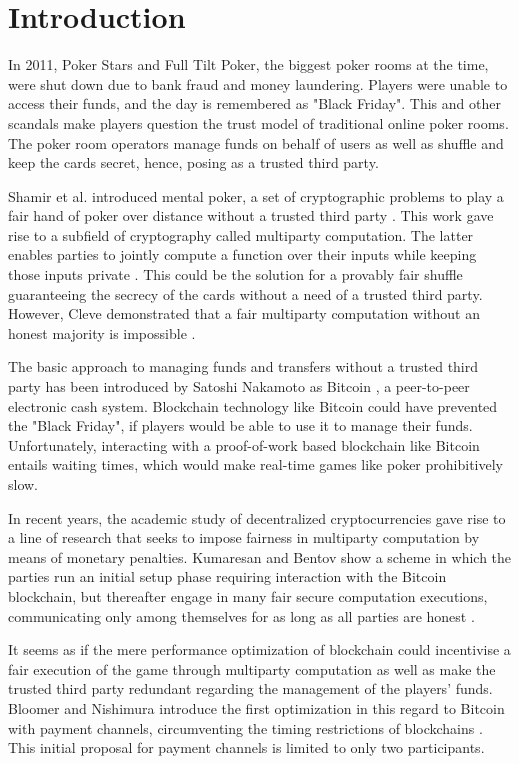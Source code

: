 \section{Introduction}

In 2011, Poker Stars and Full Tilt Poker, the biggest poker rooms at the time, were shut down due to bank fraud and money laundering. Players were unable to access their funds, and the day is remembered as "Black Friday"\cite{treasury11}. This and other scandals make players question the trust model of traditional online poker rooms. The poker room operators manage funds on behalf of users as well as shuffle and keep the cards secret, hence, posing as a trusted third party.

Shamir et al. \cite{shamir81} introduced mental poker, a set of cryptographic problems to play a fair hand of poker over distance without a trusted third party \cite{wikiMental}. This work gave rise to a subfield of cryptography called multiparty computation. The latter enables parties to jointly compute a function over their inputs while keeping those inputs private \cite{wikiMPC}. This could be the solution for a provably fair shuffle guaranteeing the secrecy of the cards without a need of a trusted third party. However, Cleve demonstrated that a fair multiparty computation without an honest majority is impossible \cite{cleve86}.

The basic approach to managing funds and transfers without a trusted third party has been introduced by Satoshi Nakamoto as Bitcoin \cite{nakamoto08}, a peer-to-peer electronic cash system. Blockchain technology like Bitcoin could have prevented the "Black Friday", if players would be able to use it to manage their funds. Unfortunately, interacting with a proof-of-work based blockchain like Bitcoin entails waiting times, which would make real-time games like poker prohibitively slow.

In recent years, the academic study of decentralized cryptocurrencies gave rise to a line of research that seeks to impose fairness in multiparty computation by means of monetary penalties. Kumaresan and Bentov show a scheme in which the parties run an initial setup phase requiring interaction with the Bitcoin blockchain, but thereafter engage in many fair secure computation executions, communicating only among themselves for as long as all parties are honest \cite{bentov14}.

It seems as if the mere performance optimization of blockchain could incentivise a fair execution of the game through multiparty computation as well as make the trusted third party redundant regarding the management of the players' funds. Bloomer and Nishimura introduce the first optimization in this regard to Bitcoin with payment channels, circumventing the timing restrictions of blockchains \cite{bloomer14}. This initial proposal for payment channels is limited to only two participants.

